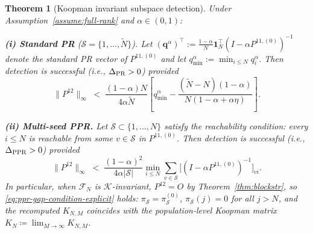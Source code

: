 \documentclass{article}
\theoremstyle{plain}
\newtheorem{theorem}{Theorem}
\theoremstyle{definition}
\def\tp{\intercal}
\def\Koop{\mathcal{K}}
\def\Fc{\mathcal{F}}
\newcommand{\arXivtag}[1][]{#1}
\begin{document}
	
	\begin{theorem}[Koopman invariant subspace detection]\label{thm:detection}
		Under Assumption~\ref{assume:full-rank} and $\alpha \in (0,1)$:
		
		\smallskip
		\noindent\textbf{(i) Standard PR} ($\mathcal{S} = \{1,\ldots,\tilde{N}\}$). 
		Let $(\mathbf{q}^{\alpha})^\tp := \tfrac{1-\alpha}{N}\mathbf{1}_N^\tp(I - \alpha P^{11,(0)})^{-1}$ denote the standard PR vector of $P^{11,(0)}$ and let  $q_{\min}^\alpha := \min_{i \leq N}q_i^\alpha$. Then detection is successful (i.e., $\Delta_{\textup{PR}}>0$) provided
		\begin{equation}\label{eq:pr-gap-condition-explicit}
			\|P^{12}\|_\infty \;<\; \frac{(1-\alpha)N}{4\alpha\tilde{N}}\!\left[q_{\min}^\alpha - \frac{(\tilde{N}-N)(1-\alpha)}{N(1-\alpha+\alpha\eta)}\right].
		\end{equation}
		
		\smallskip
		\noindent\textbf{(ii) Multi-seed PPR.} Let $\mathcal{S} \subset \{1,\ldots,N\}$ satisfy the reachability condition: every $i \leq N$ is reachable from some $v \in \mathcal{S}$ in $P^{11,(0)}$. Then detection is successful (i.e., $\Delta_{\textnormal{PPR}} > 0$) provided
	\begin{equation}\label{eq:ppr-gap-condition-explicit}
		\|P^{12}\|_\infty \;<\; \frac{(1-\alpha)^2}{4\alpha|\mathcal{S}|}\min_{i\leq N}\sum_{v\in\mathcal{S}}\bigl[(I - \alpha P^{11,(0)})^{-1}\bigr]_{vi}.
	\end{equation}
	In particular, when $\Fc_N$ is $\Koop$-invariant, $P^{12} = O$ by Theorem~\ref{thm:blockstr}, so \eqref{eq:ppr-gap-condition-explicit} holds: $\pi_{\mathcal{S}} = \pi^{(0)}_{\mathcal{S}}$, $\pi_{\mathcal{S}}(j) = 0$ for all $j > N$, and the recomputed $K_{N,M}$ \arXivtag[coincides with the population-level Koopman matrix $K_N\coloneqq\lim_{M\to\infty}K_{N,M}$.]
\end{theorem}
\end{document}
